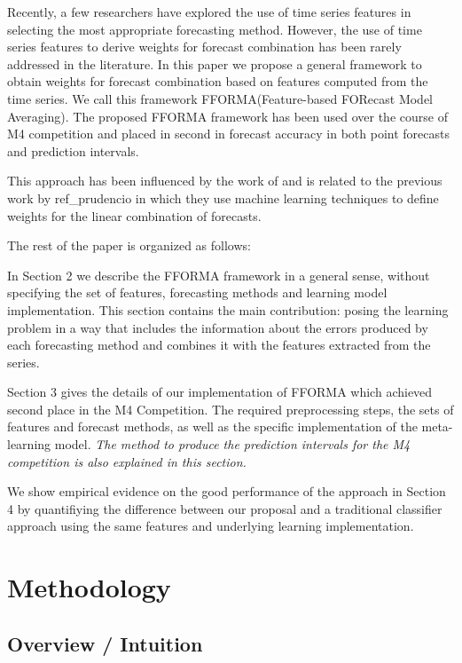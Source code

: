 \documentclass[11pt,a4paper,]{article}
\theoremstyle{definition}
\theoremstyle{definition}
\theoremstyle{definition}
\theoremstyle{remark}
\begin{document}
Recently, a few researchers have explored the use of time series
features in selecting the most appropriate forecasting method. However,
the use of time series features to derive weights for forecast
combination has been rarely addressed in the literature. In this paper
we propose a general framework to obtain weights for forecast
combination based on features computed from the time series. We call
this framework FFORMA(Feature-based FORecast Model Averaging). The
proposed FFORMA framework has been used over the course of M4
competition and placed in second in forecast accuracy in both point
forecasts and prediction intervals.

This approach has been influenced by the work of \textcite{fforms} and
is related to the previous work by ref\_prudencio in which they use
machine learning techniques to define weights for the linear combination
of forecasts.

The rest of the paper is organized as follows:

In Section 2 we describe the FFORMA framework in a general sense,
without specifying the set of features, forecasting methods and learning
model implementation. This section contains the main contribution:
posing the learning problem in a way that includes the information about
the errors produced by each forecasting method and combines it with the
features extracted from the series.

Section 3 gives the details of our implementation of FFORMA which
achieved second place in the M4 Competition. The required preprocessing
steps, the sets of features and forecast methods, as well as the
specific implementation of the meta-learning model. \emph{The method to
produce the prediction intervals for the M4 competition is also
explained in this section.}

We show empirical evidence on the good performance of the approach in
Section 4 by quantifiying the difference between our proposal and a
traditional classifier approach using the same features and underlying
learning implementation.

\section{Methodology}\label{methodology}

\subsection{Overview / Intuition}\label{overview-intuition}
\end{document}
